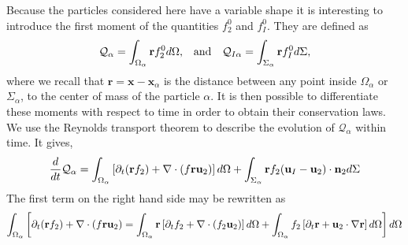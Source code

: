 Because the particles considered here have a variable shape it is interesting to introduce the first moment of the quantities $f_2^0$ and $f_I^0$. They are defined as %
\begin{align}
    &\mathcal{Q}_\alpha 
    = \int_{\Omega_\alpha}  \textbf{r} f_2^0  d\Omega,
    &\text{and}&
    &\mathcal{Q}_{I\alpha}
    = \int_{\Sigma_\alpha}  \textbf{r} f_I^0  d\Sigma,
    \label{eq:first_moment_definition}
\end{align}
where we recall that $\textbf{r} = \textbf{x} - \textbf{x}_\alpha$ is the distance between any point inside $\Omega_\alpha$ or $\Sigma_\alpha$, to the center of mass of the particle $\alpha$.
It is then possible to differentiate these moments with respect to time in order to obtain their conservation laws.
We use the Reynolds transport theorem to describe the evolution of $\mathcal{Q}_\alpha$ within time. 
It gives, 
\begin{equation}
    \frac{d}{dt} \mathcal{Q}_\alpha
      =  \int_{\Omega_\alpha} \left[
        \partial_t(\textbf{r}  f_2)
        + \mathbf{\nabla}\cdot \left(f \textbf{r} \textbf{u}_2\right)
    \right]d\Omega + \int_{\Sigma_\alpha} \textbf{r}  f_2  (\textbf{u}_I-\textbf{u}_2)\cdot \textbf{n}_2  d\Sigma  \nonumber
\end{equation}
The first term on the right hand side may be rewritten as
\begin{equation}
\int_{\Omega_\alpha} \left[
        \partial_t(\textbf{r}  f_2)+ \mathbf{\nabla}\cdot \left(f \textbf{r} \textbf{u}_2\right) = \int_{\Omega_\alpha} \textbf{r}\left[
        \partial_t f_2
        + \mathbf{\nabla}\cdot \left(f_2 \textbf{u}_2\right)
    \right] d\Omega
    + \int_{\Omega_\alpha} f_2 \left[
        \partial_t \textbf{r}
        +\textbf{u}_2 \cdot \mathbf{\nabla} \textbf{r}
    \right]d\Omega
    \right]d\Omega
\end{equation}
